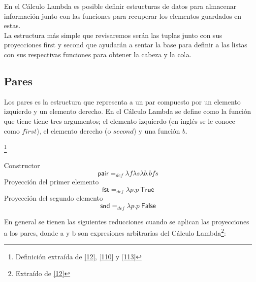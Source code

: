             En el Cálculo Lambda es posible definir estructuras de datos para almacenar información junto con las funciones para recuperar los elementos guardados en estas. \\
	 La estructura más simple que revisaremos serán las tuplas junto con sus proyecciones \textsf{first} y \textsf{second} que ayudarán a sentar la base para definir a las listas con sus respectivas funciones para obtener la cabeza y la cola. 
    
            \subsection{Pares}

                Los pares es la estructura que representa a un par compuesto por un elemento izquierdo y un elemento derecho. En el Cálculo Lambda se define como la función que tiene tiene tres argumentos; el elemento izquierdo (en inglés se le conoce como $first$), el elemento derecho (o $second$) y una función $b$.
        
                \begin{definition}\footnote{Definición extraída de \hyperlink{12}{[12]},  \hyperlink{110}{[110]} y   \hyperlink{113}{[113]}}
            
                    Constructor
                        $$\mathsf{pair} =_{def} \lambda f\lambda s\lambda b. bfs$$
                    Proyección del primer elemento
                        $$\mathsf{fst} =_{def} \lambda p.p \ \textsf{True}$$
                    Proyección del segundo elemento
                        $$\mathsf{snd} =_{def} \lambda p.p \ \textsf{False}$$

                \end{definition}

    En general se tienen las siguientes reducciones cuando se aplican las proyecciones a los pares, donde a y b son expresiones arbitrarias del Cálculo Lambda\footnote{Extraído de \hyperlink{12}{[12]}}:

